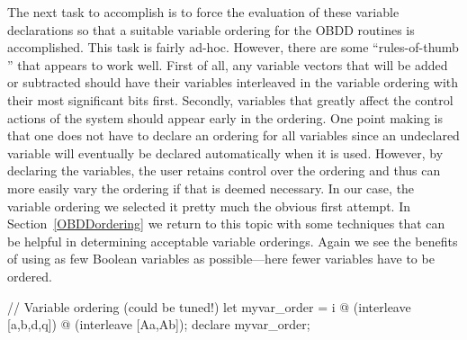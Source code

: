The next task to accomplish is to force the evaluation of these
variable declarations so that a suitable variable ordering%
%
{} for the
OBDD routines is accomplished.
This task is fairly ad-hoc.
However, there are some ``rules-of-thumb%
%
{}'' that appears to work well.
First of all, any variable vectors that will be added or subtracted
should have their variables interleaved%
%
{} in the variable ordering with their
most significant bits first. 
Secondly, variables that greatly affect the control%
%
{} actions of the
system should appear early in the ordering.
One point making is that one does not have to declare an ordering
for all variables since an undeclared variable will eventually
be declared automatically when it is used.
However, by declaring the variables, the user retains control over
the ordering and thus can more easily vary the ordering if that
is deemed necessary.
In our case, the variable ordering we selected it pretty much the
obvious first attempt.
In Section~\ref{OBDDordering} we return to this topic with some
techniques that can be helpful in determining acceptable
variable orderings.
Again we see the benefits of using as few Boolean variables
as possible---here fewer variables have to be ordered.
\begin{hol}
// Variable ordering (could be tuned!)
let myvar\_order = i @ (interleave [a,b,d,q]) @ (interleave [Aa,Ab]);
declare myvar\_order;
\end{hol}


